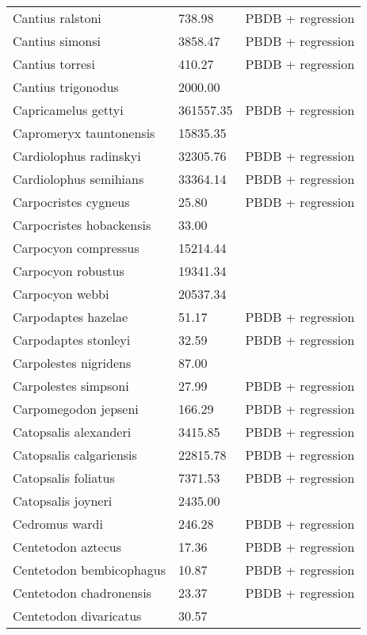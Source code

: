 \documentclass{article}
\begin{document}
\begin{center}
\begin{longtable}{p{} p{} p{}}
    Cantius ralstoni & 738.98 & PBDB + regression \\ 
    Cantius simonsi & 3858.47 & PBDB + regression \\ 
    Cantius torresi & 410.27 & PBDB + regression \\ 
    Cantius trigonodus & 2000.00 & \cite{Soligo2006} \\ 
    Capricamelus gettyi & 361557.35 & PBDB + regression \\ 
    Capromeryx tauntonensis & 15835.35 & \cite{Tomiya2013} \\ 
    Cardiolophus radinskyi & 32305.76 & PBDB + regression \\ 
    Cardiolophus semihians & 33364.14 & PBDB + regression \\ 
    Carpocristes cygneus & 25.80 & PBDB + regression \\ 
    Carpocristes hobackensis & 33.00 & \cite{Soligo2006} \\ 
    Carpocyon compressus & 15214.44 & \cite{Tomiya2013} \\ 
    Carpocyon robustus & 19341.34 & \cite{Tomiya2013} \\ 
    Carpocyon webbi & 20537.34 & \cite{Tomiya2013} \\ 
    Carpodaptes hazelae & 51.17 & PBDB + regression \\ 
    Carpodaptes stonleyi & 32.59 & PBDB + regression \\ 
    Carpolestes nigridens & 87.00 & \cite{Scott2003a} \\ 
    Carpolestes simpsoni & 27.99 & PBDB + regression \\ 
    Carpomegodon jepseni & 166.29 & PBDB + regression \\ 
    Catopsalis alexanderi & 3415.85 & PBDB + regression \\ 
    Catopsalis calgariensis & 22815.78 & PBDB + regression \\ 
    Catopsalis foliatus & 7371.53 & PBDB + regression \\ 
    Catopsalis joyneri & 2435.00 & \cite{Wilson2012} \\ 
    Cedromus wardi & 246.28 & PBDB + regression \\ 
    Centetodon aztecus & 17.36 & PBDB + regression \\ 
    Centetodon bembicophagus & 10.87 & PBDB + regression \\ 
    Centetodon chadronensis & 23.37 & PBDB + regression \\ 
    Centetodon divaricatus & 30.57 & \cite{Tomiya2013} \\ 

\end{longtable}
\end{center}
\end{document}
